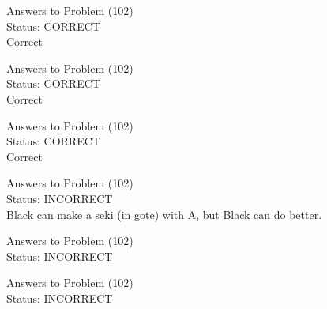 \documentclass[11pt]{article}
\begin{document}
\begin{minipage}[t]{0.5\textwidth}
  {\centering
  
  Answers to Problem (102)\\
  Status: CORRECT\\
  Correct\\
  }
\end{minipage}
\begin{minipage}[t]{0.5\textwidth}
  {\centering
  
  Answers to Problem (102)\\
  Status: CORRECT\\
  Correct\\
  }
\end{minipage}
\begin{minipage}[t]{0.5\textwidth}
  {\centering
  
  Answers to Problem (102)\\
  Status: CORRECT\\
  Correct\\
  }
\end{minipage}
\begin{minipage}[t]{0.5\textwidth}
  {\centering
  
  Answers to Problem (102)\\
  Status: INCORRECT\\
  Black can make a seki (in gote) with A, but Black can do better.\\
  }
\end{minipage}
\begin{minipage}[t]{0.5\textwidth}
  {\centering
  
  Answers to Problem (102)\\
  Status: INCORRECT\\
  
  }
\end{minipage}
\begin{minipage}[t]{0.5\textwidth}
  {\centering
  
  Answers to Problem (102)\\
  Status: INCORRECT\\
  
  }
\end{minipage}
\end{document}
